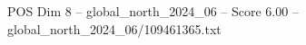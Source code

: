 \begin{textsample}{POS Dim 8 – global\_north\_2024\_06 – Score 6.00 – global\_north\_2024\_06/109461365.txt}
\end{textsample}
